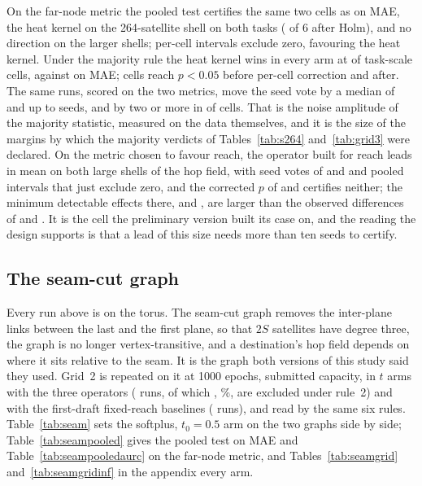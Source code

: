 \documentclass[preprint,11pt,3p]{elsarticle}
\begin{document}
On the far-node metric the pooled test certifies the same two cells as on MAE, the heat kernel
on the 264-satellite shell on both tasks (\numPooledSigHolmAurc{} of 6 after Holm), and no
direction on the larger shells; \numCIExclZeroAurc{} per-cell intervals exclude zero,
\numCIExclZeroHeatAurc{} favouring the heat kernel. Under the majority rule the heat kernel wins
in every arm at \numAurcHeatRobust{} of \numGthreeCells{} task-scale cells, against
\numGthreeHeatRobust{} on MAE; \numAurcSigRaw{} cells reach $p<0.05$ before per-cell correction
and \numAurcSigHolm{} after. The same runs, scored on the two metrics, move the seed vote by a
median of \numSwapMedianMoved{} and up to \numSwapMaxMoved{} seeds, and by two or more in
\numSwapCellsMovedTwoPlus{} of \numSwapCells{} cells. That is the
noise amplitude of the majority statistic, measured on the data themselves, and it is the size of
the margins by which the majority verdicts of Tables~\ref{tab:s264} and~\ref{tab:grid3} were
declared. On the metric chosen to favour reach, the operator built for reach leads in mean on
both large shells of the hop field, with seed votes of \numPooledAurcHopsShellOneWins{} and
\numPooledAurcHopsDoubleWins{} and pooled intervals that just exclude zero, and the corrected
$p$ of \numPooledAurcHopsShellOneHolm{} and \numPooledAurcHopsDoubleHolm{} certifies neither;
the minimum detectable effects there, \numPooledAurcHopsShellOneMde{} and
\numPooledAurcHopsDoubleMde{}, are larger than the observed differences of
\numPooledAurcHopsShellOneD{} and \numPooledAurcHopsDoubleD{}. It is the cell the preliminary
version built its case on, and the reading the design supports is that a lead of this size needs more than
ten seeds to certify.

\subsection{The seam-cut graph}
\label{sec:seam}

Every run above is on the torus. The seam-cut graph removes the inter-plane links between the
last and the first plane, so that $2S$ satellites have degree three, the graph is no longer
vertex-transitive, and a destination's hop field depends on where it sits relative to the seam.
It is the graph both versions of this study said they used. Grid~2 is repeated on it at 1000
epochs, submitted capacity, in \numSeamArms{} $t$ arms with the three operators
(\numSeamCoreRuns{} runs, of which \numSeamPathology{}, \numSeamPathologyPct\%, are excluded under
rule~2) and with the first-draft fixed-reach baselines (\numSeamFixedRuns{} runs), and read by the
same six rules. Table~\ref{tab:seam} sets the softplus, $t_{0}=0.5$ arm on the two graphs side by
side; Table~\ref{tab:seampooled} gives the pooled test on MAE and Table~\ref{tab:seampooledaurc}
on the far-node metric, and Tables~\ref{tab:seamgrid} and~\ref{tab:seamgridinf} in the appendix
every arm.
\end{document}
